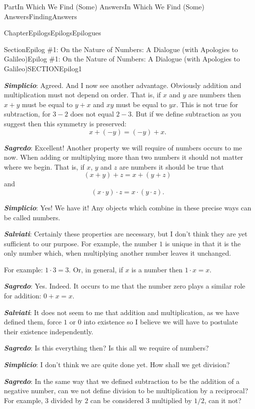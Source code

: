 \documentclass[oneside,10pt,]{book}
\newcommand{\alert}[1]{\textbf{\textit{#1}}}
\numberwithin{equation}{part}
\begin{document}
\begin{partptx}{Part}{In Which We Find (Some) Answers}{}{In Which We Find (Some) Answers}{}{}{FindingAnswers}
\begin{chapterptx}{Chapter}{Epilogs}{}{Epilogs}{}{}{Epilogues}
\begin{sectionptx}{Section}{Epilog \#1: On the Nature of Numbers: A Dialogue (with Apologies to Galileo)}{}{Epilog \#1: On the Nature of Numbers: A Dialogue (with Apologies to Galileo)}{}{}{SECTIONEpilog1}
\par
\alert{Simplicio}:  Agreed. And I now see another advantage. Obviously addition and multiplication must not depend on order. That is, if \(x\) and \(y\) are numbers then \(x+y\) must be equal to \(y+x\) and \(xy\) must be equal to \(yx\). This is not true for subtraction, for \(3-2\) does not equal \(2-3\). But if we define subtraction as you suggest then this symmetry is preserved:%
\begin{equation*}
x+(-y) = (-y)+x\text{.}
\end{equation*}
%
\par
\alert{Sagredo}:  Excellent! Another property we will require of numbers occurs to me now. When adding or multiplying more than two numbers it should not matter where we begin. That is, if \(x\), \(y\) and \(z\) are numbers it should be true that%
\begin{equation*}
(x+y)+z = x+(y+z)
\end{equation*}
and%
\begin{equation*}
(x\cdot y)\cdot z = x\cdot(y\cdot z)\text{.}
\end{equation*}
%
\par
\alert{Simplicio}:  Yes! We have it! Any objects which combine in these precise ways can be called numbers.%
\par
\alert{Salviati}:  Certainly these properties are necessary, but I don't think they are yet sufficient to our purpose. For example, the number \(1\) is unique in that it is the only number which, when multiplying another number leaves it unchanged.%
\par
For example:  \(1\cdot3=3\). Or, in general, if \(x\) is a number then \(1\cdot x =x\).%
\par
\alert{Sagredo}:  Yes. Indeed. It occurs to me that the number zero plays a similar role for addition: \(0+x=x\).%
\par
\alert{Salviati}:  It does not seem to me that addition and multiplication, as we have defined them, force \(1\) or \(0\) into existence so I believe we will have to postulate their existence independently.%
\par
\alert{Sagredo}:  Is this everything then? Is this all we require of numbers?%
\par
\alert{Simplicio}:  I don't think we are quite done yet. How shall we get division?%
\par
\alert{Sagredo}: In the same way that we defined subtraction to be the addition of a negative number, can we not define division to be multiplication by a reciprocal?  For example, \(3\) divided by \(2\) can be considered \(3\) multiplied by \(1/2\), can it not?%

\end{sectionptx}
\end{chapterptx}
\end{partptx}
\end{document}
